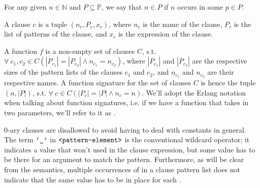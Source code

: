 \begin{definition} For any given $n\in\mathbb{N}$ and $P\subseteq\mathbb{P}$,
we say that $n\in P$ if $n$ occurs in some $p\in P$.\end{definition}

\begin{definition} A clause $c$ is a tuple $(n_c,P_c,x_c)$, where $n_c$ is the
name of the clause, $P_c$ is the list of patterns of the clause, and $x_c$ is
the expression of the clause.\end{definition}

\begin{definition} A function $f$ is a non-empty set of clauses $C$, s.t.
$\forall\ c_1,c_2\in C \left(|P_{c_1}|=|P_{c_2}|\wedge n_{c_1}=n_{c_2}\right)$,
where $|P_{c_1}|$ and $|P_{c_2}|$ are the respective sizes of the pattern lists
of the clauses $c_1$ and $c_2$, and $n_{c_1}$ and $n_{c_2}$ are their
respective names. A function signature for the set of clauses $C$ is hence the
tuple $(n,|P|)$, s.t. $\forall\ c\in C (|P_c|=|P|\wedge n_c=n)$.  We'll adopt
the Erlang notation when talking about function signatures, i.e. if we have a
function  that takes in two parameters, we'll refer to it as
.\end{definition}

0-ary clauses are disallowed to avoid having to deal with constants in general.
The term $\text{{\ttfamily`\_'}}$ in $\text{{\ttfamily<pattern-element>}}$ is the conventional
wildcard operator; it indicates a value that won't used in the clause
expression, but some value has to be there for an argument to match the
pattern. Furthermore, as will be clear from the semantics, multiple occurrences
of \term{\_} in a clause pattern list does not indicate that the same value has
to be in place for each \term{\_}. 


